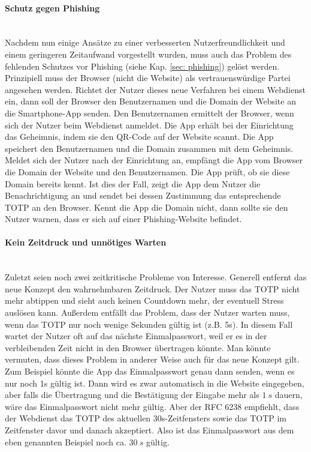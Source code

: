 \paragraph*{Schutz gegen Phishing}
\mbox{} \vspace{0.1cm} \\
Nachdem nun einige Ansätze zu einer verbesserten Nutzerfreundlichkeit und einem 
geringeren Zeitaufwand vorgestellt wurden, muss auch das Problem des fehlenden 
Schutzes vor Phishing (siehe Kap. \ref{sec: phishing}) gelöst werden. Prinzipiell 
muss der Browser (nicht die Website) als vertrauenswürdige Partei angesehen 
werden. Richtet der Nutzer dieses neue Verfahren bei einem Webdienst ein, dann 
soll der Browser den Benutzernamen und die Domain der Website an die 
Smartphone-App senden. Den Benutzernamen ermittelt der Browser, wenn sich der 
Nutzer beim Webdienst anmeldet. Die App erhält bei der Einrichtung das Geheimnis, 
indem sie den QR-Code auf der Website scannt. Die App speichert den Benutzernamen 
und die Domain zusammen mit dem Geheimnis. Meldet sich der Nutzer nach der 
Einrichtung an, empfängt die App vom Browser die Domain der Website und den 
Benutzernamen. Die App prüft, ob sie diese Domain bereits kennt. Ist dies der 
Fall, zeigt die App dem Nutzer die Benachrichtigung an und sendet bei dessen 
Zustimmung das entsprechende TOTP an den Browser. Kennt die App die Domain nicht, 
dann sollte sie den Nutzer warnen, dass er sich auf einer Phishing-Website 
befindet.

\paragraph*{Kein Zeitdruck und unnötiges Warten}
\mbox{} \vspace{0.1cm} \\
Zuletzt seien noch zwei zeitkritische Probleme von Interesse. Generell entfernt 
das neue Konzept den wahrnehmbaren Zeitdruck. Der Nutzer muss das TOTP nicht mehr 
abtippen und sieht auch keinen Countdown mehr, der eventuell Stress auslösen 
kann. Außerdem entfällt das Problem, dass der Nutzer warten muss, wenn das TOTP 
nur noch wenige Sekunden gültig ist (z.B. 5s). In diesem Fall wartet der Nutzer oft 
auf das nächste Einmalpasswort, weil er es in der verbleibenden Zeit nicht in den 
Browser übertragen könnte. Man könnte vermuten, dass dieses Problem in anderer 
Weise auch für das neue Konzept gilt. Zum Beispiel könnte die App das 
Einmalpasswort genau dann senden, wenn es nur noch 1s gültig ist. Dann wird es 
zwar automatisch in die Website eingegeben, aber falls die Übertragung und die 
Bestätigung der Eingabe mehr als $1~s$ dauern, wäre das Einmalpasswort nicht mehr 
gültig. Aber der RFC 6238 empfiehlt, dass der Webdienst das TOTP des aktuellen 
30s-Zeitfensters sowie das TOTP im Zeitfenster davor und danach akzeptiert. Also 
ist das Einmalpasswort aus dem eben genannten Beispiel noch ca. $30~s$ gültig.